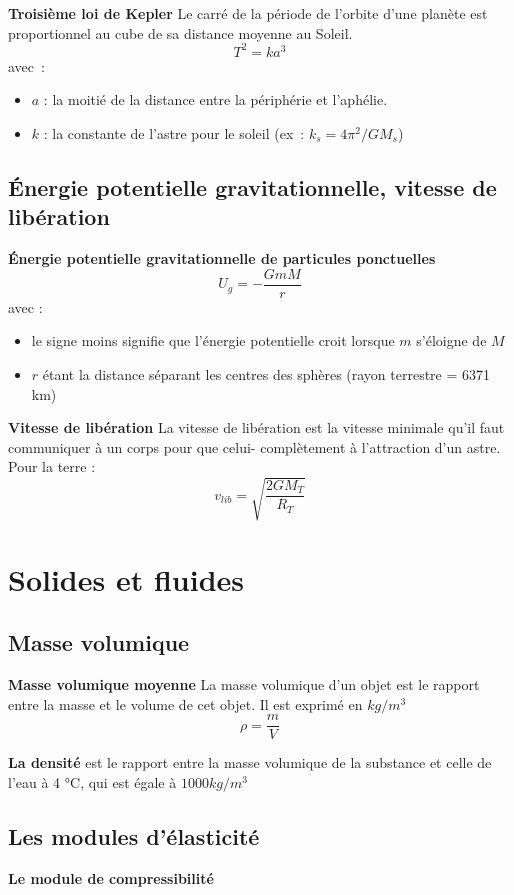 \documentclass{article}
\begin{document}
\noindent
\textbf{Troisième loi de Kepler}
\newline
Le carré de la période de l'orbite d'une planète est proportionnel au cube de sa distance moyenne au Soleil.
\[T^2 = ka^3 \]
avec :
\begin{itemize}
    \item $a$ : la moitié de la distance entre la périphérie et l'aphélie.
    \item $k$ : la constante de l'astre pour le soleil (ex : $k_s = 4\pi^2/GM_s$) 
\end{itemize}

\subsection{Énergie potentielle gravitationnelle, vitesse de libération}
\textbf{Énergie potentielle gravitationnelle de particules ponctuelles}
\[U_g = -\frac{GmM}{r}\]
avec :
\begin{itemize}
    \item le signe moins signifie que l'énergie potentielle croit lorsque $m$ s'éloigne de $M$
    \item $r$ étant la distance séparant les centres des sphères (rayon terrestre = 6371 km)
\end{itemize}
\newline

\noindent
\textbf{Vitesse de libération}
La vitesse de libération est la vitesse minimale qu'il faut communiquer à un corps pour que celui- complètement à l'attraction d'un astre.
\newline
Pour la terre :
\[v_{lib} = \sqrt{\frac{2GM_T}{R_T}}\]

\section{Solides et fluides}

\subsection{Masse volumique}
\textbf{Masse volumique moyenne}
La masse volumique d'un objet est le rapport entre la masse et le volume de cet objet. Il est exprimé en $kg/m^3$
\[\rho = \frac{m}{V}\]
\newline

\textbf{La densité} est le rapport entre la masse volumique de la substance et celle de l'eau à 4 °C, qui est égale à $1000kg/m^3$


\subsection{Les modules d'élasticité}
\textbf{Le module de compressibilité}
\newline
\end{document}
